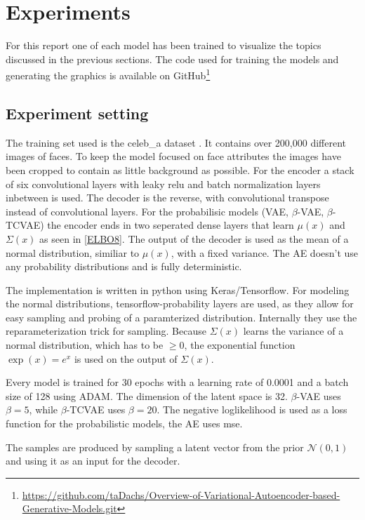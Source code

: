 \documentclass[a4paper]{IEEEtran}
\begin{document}
\section{Experiments}
\label{sec:experiments}


For this report one of each model has been trained to visualize the topics discussed in the previous sections. The code used for training the models and generating the graphics is available on GitHub\footnote{\url{https://github.com/taDachs/Overview-of-Variational-Autoencoder-based-Generative-Models.git}}

\subsection{Experiment setting}
The training set used is the celeb\_a dataset \cite{liu2015faceattributes}. It contains over 200,000 different images of faces. To keep the model focused on face attributes the images have been cropped to contain as little background as possible. For the encoder a stack of six convolutional layers with leaky relu and batch normalization layers inbetween is used. The decoder is the reverse, with convolutional transpose instead of convolutional layers. For the probabilisic models (VAE, $\beta$-VAE, $\beta$-TCVAE) the encoder ends in two seperated dense layers that learn $\mu(x)$ and $\Sigma(x)$ as seen in \eqref{ELBO8}. The output of the decoder is used as the mean of a normal distribution, similiar to $\mu(x)$, with a fixed variance. The AE doesn't use any probability distributions and is fully deterministic.

The implementation is written in python using Keras/Tensorflow. For modeling the normal distributions, tensorflow-probability layers are used, as they allow for easy sampling and probing of a paramterized distribution. Internally they use the reparameterization trick for sampling. Because $\Sigma(x)$ learns the variance of a normal distribution, which has to be $\geq 0$, the exponential function $\exp(x) = e^x$ is used on the output of $\Sigma(x)$.

Every model is trained for 30 epochs with a learning rate of 0.0001 and a batch size of 128 using ADAM\cite{DBLP:journals/corr/KingmaB14}. The dimension of the latent space is 32. $\beta$-VAE uses $\beta = 5$, while $\beta$-TCVAE uses $\beta = 20$. The negative loglikelihood is used as a loss function for the probabilistic models, the AE uses mse.

The samples are produced by sampling a latent vector from the prior $\mathcal{N}(0,1)$ and using it as an input for the decoder.
\end{document}
